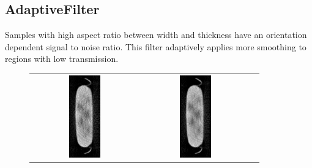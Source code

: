 \documentclass[a4paper]{scrreprt}
\begin{document}
\subsection{AdaptiveFilter}
Samples with high aspect ratio between width and thickness have an orientation
dependent signal to noise ratio\cite{kachelriess2001_filter}. This filter adaptively applies more smoothing
to regions with low transmission.
\begin{figure}[ht!]
\centering
\begin{tabular}{ccc}
\includegraphics[angle=90, width=0.3\textwidth]{figures/adaptive_raw.png} &
\includegraphics[angle=90, width=0.3\textwidth]{figures/adaptive_filtered.png} &

\end{tabular}
\end{figure}
\end{document}
